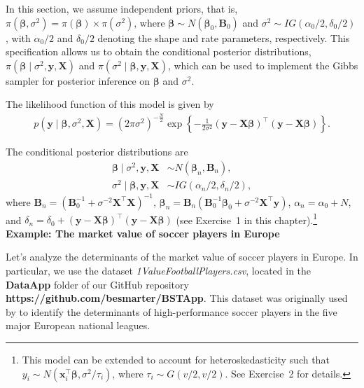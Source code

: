 In this section, we assume independent priors, that is, $\pi(\bm{\beta}, \sigma^2) = \pi(\bm{\beta}) \times \pi(\sigma^2)$, where $\bm{\beta} \sim N(\bm{\beta}_0, {\bm{B}}_0)$ and $\sigma^2 \sim IG(\alpha_0/2, \delta_0/2)$, with $\alpha_0/2$ and $\delta_0/2$ denoting the shape and rate parameters, respectively. This specification allows us to obtain the conditional posterior distributions, $\pi(\bm{\beta} \mid \sigma^2, {\bm{y}}, {\bm{X}})$ and $\pi(\sigma^2 \mid \bm{\beta}, {\bm{y}}, {\bm{X}})$, which can be used to implement the Gibbs sampler for posterior inference on $\bm{\beta}$ and $\sigma^2$.

The likelihood function of this model is given by
\begin{align*}
	p({\bm{y}} \mid \bm{\beta}, \sigma^2, {\bm{X}}) 
	= (2\pi\sigma^2)^{-\frac{N}{2}} 
	\exp\left\{ -\frac{1}{2\sigma^2} ({\bm{y}} - {\bm{X}}\bm{\beta})^{\top} ({\bm{y}} - {\bm{X}}\bm{\beta}) \right\}.
\end{align*}

The conditional posterior distributions are
\begin{align*}
	\bm{\beta} \mid \sigma^2, {\bm{y}}, {\bm{X}} &\sim N(\bm{\beta}_n, {\bm{B}}_n), \\
	\sigma^2 \mid \bm{\beta}, {\bm{y}}, {\bm{X}} &\sim IG(\alpha_n/2, \delta_n/2),
\end{align*}
where 
${\bm{B}}_n = ({\bm{B}}_0^{-1} + \sigma^{-2} {\bm{X}}^{\top}{\bm{X}})^{-1}$, 
$\bm{\beta}_n = {\bm{B}}_n ({\bm{B}}_0^{-1}\bm{\beta}_0 + \sigma^{-2} {\bm{X}}^{\top}{\bm{y}})$, 
$\alpha_n = \alpha_0 + N$, and 
$\delta_n = \delta_0 + ({\bm{y}} - {\bm{X}}\bm{\beta})^{\top}({\bm{y}} - {\bm{X}}\bm{\beta})$ 
(see Exercise~1 in this chapter).\footnote{This model can be extended to account for heteroskedasticity such that $y_i \sim N({\bm{x}}_i^{\top}\bm{\beta}, \sigma^2/\tau_i)$, where $\tau_i \sim G(v/2, v/2)$. See Exercise~2 for details.}\\

\textbf{Example: The market value of soccer players in Europe}

Let's analyze the determinants of the market value of soccer players in Europe. In particular, we use the dataset \textit{1ValueFootballPlayers.csv}, located in the \textbf{DataApp} folder of our GitHub repository \textbf{\textbf{https://github.com/besmarter/BSTApp}}. This dataset was originally used by \cite{Serna2018} to identify the determinants of high-performance soccer players in the five major European national leagues.

